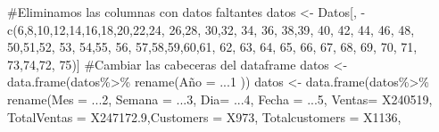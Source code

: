 \documentclass[
  us-letterpaper,
]{scrreprt}
\newenvironment{Shaded}{\begin{snugshade}}{\end{snugshade}}
\newcommand{\AttributeTok}[1]{\textcolor[rgb]{0.40,0.45,0.13}{#1}}
\newcommand{\CommentTok}[1]{\textcolor[rgb]{0.37,0.37,0.37}{#1}}
\newcommand{\DecValTok}[1]{\textcolor[rgb]{0.68,0.00,0.00}{#1}}
\newcommand{\FloatTok}[1]{\textcolor[rgb]{0.68,0.00,0.00}{#1}}
\newcommand{\FunctionTok}[1]{\textcolor[rgb]{0.28,0.35,0.67}{#1}}
\newcommand{\NormalTok}[1]{\textcolor[rgb]{0.00,0.23,0.31}{#1}}
\newcommand{\OtherTok}[1]{\textcolor[rgb]{0.00,0.23,0.31}{#1}}
\newcommand{\SpecialCharTok}[1]{\textcolor[rgb]{0.37,0.37,0.37}{#1}}
\theoremstyle{plain}
\theoremstyle{plain}
\theoremstyle{definition}
\theoremstyle{remark}
\begin{document}
\begin{Shaded}
\begin{Highlighting}[]
\CommentTok{\#Eliminamos las columnas con datos faltantes}
\NormalTok{datos }\OtherTok{\textless{}{-}}\NormalTok{ Datos[, }\SpecialCharTok{{-}}\FunctionTok{c}\NormalTok{(}\DecValTok{6}\NormalTok{,}\DecValTok{8}\NormalTok{,}\DecValTok{10}\NormalTok{,}\DecValTok{12}\NormalTok{,}\DecValTok{14}\NormalTok{,}\DecValTok{16}\NormalTok{,}\DecValTok{18}\NormalTok{,}\DecValTok{20}\NormalTok{,}\DecValTok{22}\NormalTok{,}\DecValTok{24}\NormalTok{, }\DecValTok{26}\NormalTok{,}\DecValTok{28}\NormalTok{, }\DecValTok{30}\NormalTok{,}\DecValTok{32}\NormalTok{, }\DecValTok{34}\NormalTok{, }\DecValTok{36}\NormalTok{,}
                    \DecValTok{38}\NormalTok{,}\DecValTok{39}\NormalTok{, }\DecValTok{40}\NormalTok{,  }\DecValTok{42}\NormalTok{, }\DecValTok{44}\NormalTok{, }\DecValTok{46}\NormalTok{, }\DecValTok{48}\NormalTok{, }\DecValTok{50}\NormalTok{,}\DecValTok{51}\NormalTok{,}\DecValTok{52}\NormalTok{, }\DecValTok{53}\NormalTok{, }\DecValTok{54}\NormalTok{,}\DecValTok{55}\NormalTok{, }\DecValTok{56}\NormalTok{, }
\DecValTok{57}\NormalTok{,}\DecValTok{58}\NormalTok{,}\DecValTok{59}\NormalTok{,}\DecValTok{60}\NormalTok{,}\DecValTok{61}\NormalTok{, }\DecValTok{62}\NormalTok{, }\DecValTok{63}\NormalTok{, }\DecValTok{64}\NormalTok{, }\DecValTok{65}\NormalTok{, }\DecValTok{66}\NormalTok{, }\DecValTok{67}\NormalTok{, }\DecValTok{68}\NormalTok{, }\DecValTok{69}\NormalTok{, }\DecValTok{70}\NormalTok{, }\DecValTok{71}\NormalTok{, }\DecValTok{73}\NormalTok{,}\DecValTok{74}\NormalTok{,}\DecValTok{72}\NormalTok{, }\DecValTok{75}\NormalTok{)]}
\CommentTok{\#Cambiar las cabeceras del dataframe  }
\NormalTok{datos }\OtherTok{\textless{}{-}} \FunctionTok{data.frame}\NormalTok{(datos}\SpecialCharTok{\%\textgreater{}\%} \FunctionTok{rename}\NormalTok{(Año }\OtherTok{=}\NormalTok{ ...}\DecValTok{1}\NormalTok{ ))}
\NormalTok{datos }\OtherTok{\textless{}{-}} \FunctionTok{data.frame}\NormalTok{(datos}\SpecialCharTok{\%\textgreater{}\%} \FunctionTok{rename}\NormalTok{(}\AttributeTok{Mes =}\NormalTok{ ...}\DecValTok{2}\NormalTok{, }\AttributeTok{Semana =}\NormalTok{ ...}\DecValTok{3}\NormalTok{, }\AttributeTok{Dia=}\NormalTok{ ...}\DecValTok{4}\NormalTok{, }
                  \AttributeTok{Fecha =}\NormalTok{ ...}\DecValTok{5}\NormalTok{, }\AttributeTok{Ventas=}\NormalTok{ X240519, }
                  \AttributeTok{TotalVentas =}\NormalTok{ X247172}\FloatTok{.9}\NormalTok{,}\AttributeTok{Customers =}\NormalTok{ X973,}
                  \AttributeTok{Totalcustomers =}\NormalTok{ X1136, }

\end{Highlighting}
\end{Shaded}
\end{document}
